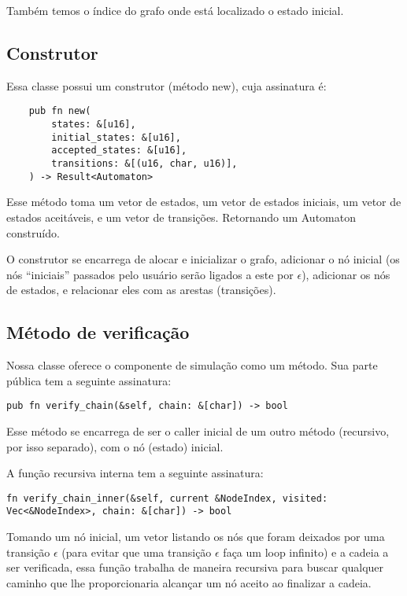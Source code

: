 \documentclass[12pt]{article}
\begin{document}
Também temos o índice do grafo onde está localizado o estado inicial.

\subsection{Construtor}
Essa classe possui um construtor (método new), cuja assinatura é:

\begin{verbatim}
    pub fn new(
        states: &[u16],
        initial_states: &[u16],
        accepted_states: &[u16],
        transitions: &[(u16, char, u16)],
    ) -> Result<Automaton>
\end{verbatim}

Esse método toma um vetor de estados, um vetor de estados iniciais, um vetor de estados aceitáveis, e um vetor de transições. Retornando um Automaton construído.

O construtor se encarrega de alocar e inicializar o grafo, adicionar o nó inicial (os nós ``iniciais'' passados pelo usuário serão ligados a este por \(\epsilon\)), adicionar os nós de estados, e relacionar eles com as arestas (transições).

\subsection{Método de verificação}

Nossa classe oferece o componente de simulação como um método. Sua parte pública tem a seguinte assinatura:
\begin{verbatim}
pub fn verify_chain(&self, chain: &[char]) -> bool
\end{verbatim}

Esse método se encarrega de ser o caller inicial de um outro método (recursivo, por isso separado), com o nó (estado) inicial.

A função recursiva interna tem a seguinte assinatura:
\begin{verbatim}
fn verify_chain_inner(&self, current &NodeIndex, visited: Vec<&NodeIndex>, chain: &[char]) -> bool
\end{verbatim}

Tomando um nó inicial, um vetor listando os nós que foram deixados por uma transição \(\epsilon\) (para evitar que uma transição \(\epsilon\) faça um loop infinito) e a cadeia a ser verificada, essa função trabalha de maneira recursiva para buscar qualquer caminho que lhe proporcionaria alcançar um nó aceito ao finalizar a cadeia.
\end{document}
